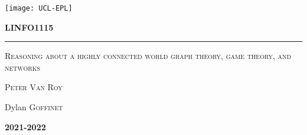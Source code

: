 \documentclass{report}
\begin{document}

\begin{titlepage}
	\flushleft\texttt{[image: UCL-EPL]}\\
	\vspace*{2cm}
	\vspace*{\fill}
	\centering
	{\scshape\LARGE\bfseries LINFO1115 \par}
	\vspace{0.4cm}
	{\color{clearBlue}\rule{0.7\textwidth}{1pt}\par}
	\vspace{0.5cm}
	{\scshape\Large Reasoning about a highly connected world graph theory, game theory, and networks \par}
	\vspace{0.5cm}
	{\scshape\large Peter Van Roy \par}
	{\Large\itshape\par}
	\vspace*{\fill}
	\vfill
	\vfill
	{\Large Dylan \textsc{Goffinet}\par}
	\vspace{0.5cm}
	{\Large\bfseries 2021-2022\par}
	{\large \par}
\end{titlepage}


\setcounter{tocdepth}{1} %
\tableofcontents
\clearpage




\end{document}
